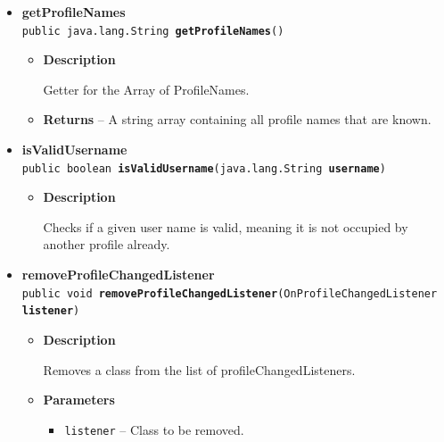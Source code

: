 \documentclass[11pt,a4paper]{report}
\begin{document}
{{{{{{{{\begin{itemize}
{\begin{itemize}
{Get the name of the currently active user.
}
\item{{\bf  Returns} -- 
The name of the currently active user; Empty String if no user is active. 
}%
\end{itemize}
}%
\item{ 
{\bf  getProfileNames}\\
\texttt{public java.lang.String\lbrack \rbrack \ {\bf  getProfileNames}()
\label{com.retroMachines.game.controllers.ProfileController.getProfileNames()}}%
\begin{itemize}
\item{
{\bf  Description}

Getter for the Array of ProfileNames.
}
\item{{\bf  Returns} -- 
A string array containing all profile names that are known. 
}%
\end{itemize}
}%
\item{ 
{\bf  isValidUsername}\\
\texttt{public boolean\ {\bf  isValidUsername}(\texttt{java.lang.String} {\bf  username})
\label{com.retroMachines.game.controllers.ProfileController.isValidUsername(java.lang.String)}}%
\begin{itemize}
\item{
{\bf  Description}

Checks if a given user name is valid, meaning it is not occupied by another profile already.
}
\end{itemize}
}%
\item{ 
{\bf  removeProfileChangedListener}\\
\texttt{public void\ {\bf  removeProfileChangedListener}(\texttt{OnProfileChangedListener} {\bf  listener})
\label{com.retroMachines.game.controllers.ProfileController.removeProfileChangedListener(com.retroMachines.game.controllers.OnProfileChangedListener)}}%
\begin{itemize}
\item{
{\bf  Description}

Removes a class from the list of profileChangedListeners.
}
\item{
{\bf  Parameters}
  \begin{itemize}
   \item{
\texttt{listener} -- Class to be removed.}
  \end{itemize}
}%
\end{itemize}
}%
\end{itemize}
}
}
}}}}}}
\end{document}
